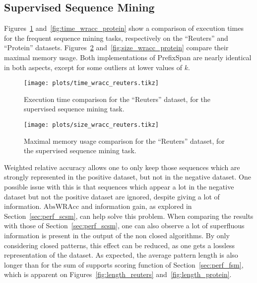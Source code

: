 \documentclass{sigkddExp}
\newcommand{\ps}{\textsf{PrefixSpan}}
\newcommand{\abswracc}{\mathrm{AbsWRAcc}}
\begin{document}
\subsection{Supervised Sequence Mining}
\label{sec:perf_ssm}
Figures~\ref{fig:time_wracc_reuters} and~\ref{fig:time_wracc_protein} show a comparison of execution times for the frequent sequence mining tasks, respectively on the ``Reuters'' and ``Protein'' datasets.
Figures~\ref{fig:size_wracc_reuters} and~\ref{fig:size_wracc_protein} compare their maximal memory usage.
Both implementations of \ps{} are nearly identical in both aspects, except for some outliers at lower values of \(k\).
\begin{figure}[!hbtp]
	\centering
	\texttt{[image: plots/time\_wracc\_reuters.tikz]}
	\caption{Execution time comparison for the ``Reuters'' dataset, for the supervised sequence mining task.}
	\label{fig:time_wracc_reuters}
\end{figure}%
\begin{figure}[!hbtp]
	\centering
	\texttt{[image: plots/size\_wracc\_reuters.tikz]}
	\caption{Maximal memory usage comparison for the ``Reuters'' dataset, for the supervised sequence mining task.}
	\label{fig:size_wracc_reuters}
\end{figure}

Weighted relative accuracy allows one to only keep those sequences which are strongly represented in the positive dataset, but not in the negative dataset.
One possible issue with this is that sequences which appear a lot in the negative dataset but not the positive dataset are ignored, despite giving a lot of information.
\(\abswracc\) and information gain, as explored in Section~\ref{sec:perf_scsm}, can help solve this problem.
When comparing the results with those of Section~\ref{sec:perf_scsm}, one can also observe a lot of superfluous information is present in the output of the non closed algorithms.
By only considering closed patterns, this effect can be reduced, as one gets a lossless representation of the dataset.
As expected, the average pattern length is also longer than for the sum of supports scoring function of Section~\ref{sec:perf_fsm}, which is apparent on Figures~\ref{fig:length_reuters} and~\ref{fig:length_protein}.
\end{document}

